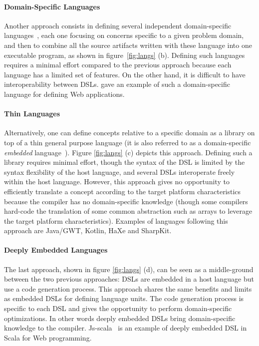 \documentclass[preprint]{sigplanconf}
\begin{document}
\paragraph{Domain-Specific Languages}

Another approach consists in defining several independent domain-specific
languages~\cite{Van00_DSL}, each one focusing on concerns specific to a given problem domain, and
then to combine all the source artifacts written with these language into one executable program, as
shown in figure~\ref{fig:langs} (b). Defining such languages requires a minimal effort compared to
the previous approach because each language has a limited set of features. On the other hand, it is
difficult to have interoperability between DSLs. \cite{Groenewegen08_WebDSL} gave an example of such
a domain-specific language for defining Web applications.

\paragraph{Thin Languages}

Alternatively, one can define concepts relative to a specific domain as a library on top of a thin
general purpose language (it is also referred to as a domain-specific \emph{embedded}
language~\cite{Hudak96_DSEL}). Figure \ref{fig:langs} (c) depicts this approach. Defining such a
library requires minimal effort, though the syntax of the DSL is limited by the syntax flexibility
of the host language, and several DSLs interoperate freely within the host language. However, this
approach gives no opportunity to efficiently translate a concept according to the target
platform characteristics because the compiler has no domain-specific knowledge (though some
compilers hard-code the translation of some common abstraction such as arrays to leverage the target
platform characteristics). Examples of languages following this approach are Java/GWT, Kotlin, HaXe
and SharpKit.

\paragraph{Deeply Embedded Languages}

The last approach, shown in figure \ref{fig:langs} (d), can be seen as a middle-ground between the
two previous approaches: DSLs are embedded in a host language but use a code generation process.
This approach shares the same benefits and limits as embedded DSLs for defining language units. The
code generation process is specific to each DSL and gives the opportunity to perform domain-specific
optimizations. In other words deeply embedded DSLs bring domain-specific knowledge to the compiler.
Js-scala~\cite{Kossakowski12_JsDESL} is an example of deeply embedded DSL in Scala for Web
programming.
\end{document}
